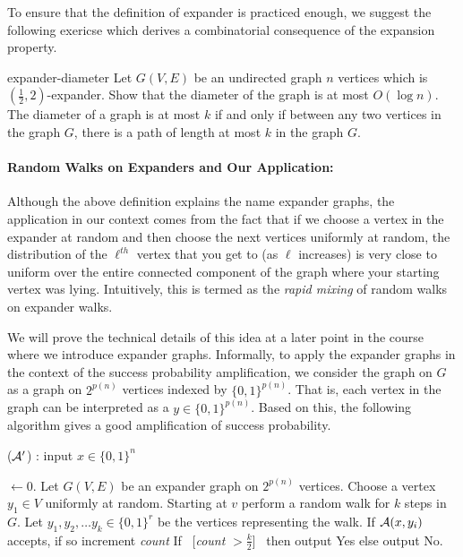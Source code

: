To ensure that the definition of expander is practiced enough, we suggest the following exericse which derives a combinatorial consequence of the expansion property.

\begin{exercise-prob}
\begin{show-ps1}{expander-diameter}
Let $G(V,E)$ be an undirected graph $n$ vertices which is $(\frac{1}{2},2)$-expander. Show that the diameter of the graph is at most $O(\log n)$. The diameter of a graph is at most $k$ if and only if between any two vertices in the graph $G$, there is a path of length at most $k$ in the graph $G$.
\end{show-ps1}
\end{exercise-prob}


\paragraph{Random Walks on Expanders and Our Application:} Although the above definition explains the name expander graphs, the application in our context comes from the fact that if we choose a vertex in the expander at random and then choose the next vertices uniformly at random, the distribution of the $\ell^{th}$ vertex that you get to (as $\ell$ increases) is very close to uniform over the entire connected component of the graph where your starting vertex was lying. Intuitively, this is termed as the {\em rapid mixing} of random walks on expander walks.

We will prove the technical details of this idea at a later point in the course where we introduce expander graphs. Informally, to apply the expander graphs in the context of the success probability amplification, we consider the graph on $G$ as a graph on $2^{p(n)}$ vertices indexed by $\{0,1\}^{p(n)}$. That is, each vertex in the graph can be interpreted as a $y \in \{0,1\}^{p(n)}$. Based on this, the following algorithm gives a good amplification of success probability.


\begin{algorithm}
\label{alg:trivial-amplification}
\caption{(${\cal{A}'}$) : input $x \in \{0,1\}^n$} 
\begin{algorithmic}[1]
 $\gets 0$. 
\State Let $G(V,E)$ be an expander graph on $2^{p(n)}$ vertices.
\State Choose a vertex $y_1 \in V$ uniformly at random. 
\State Starting at $v$ perform a random walk for $k$ steps in $G$. Let $y_1, y_2, \ldots y_k \in \{0,1\}^r$ be the vertices representing the walk. 
	\State If ${\cal{A}}(x,y_i)$ accepts, if so increment {\em count}
\EndFor
\State If ~[{\em count} $> \frac{k}{2}$]~ then output {\sc Yes} else output {\sc No}.
\end{algorithmic}
\end{algorithm}

